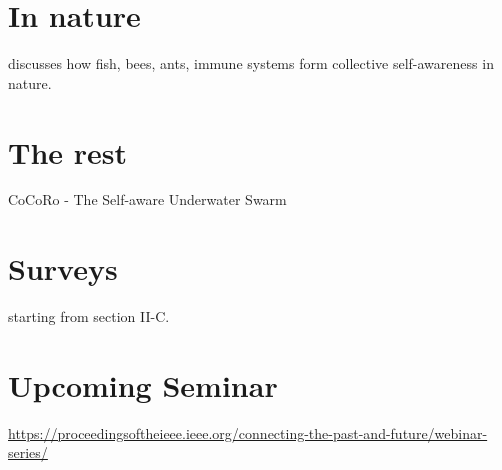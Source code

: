\documentclass{article}
\begin{document}
	\section{In nature}
	\citet{mitchell-2005-self-awareness-and-control-in-decentralized-systems} discusses how fish, bees, ants, immune systems form collective self-awareness in nature. 	
	
	\section{The rest}
	\cite{kernbach-2011-awareness-and-self-awareness-for-multi-robot-organisms}
	 
	CoCoRo - The Self-aware Underwater Swarm \cite{schmickl-2011-cocoro-the-self-aware-underwater-swarm}
	\section{Surveys}
	\cite{lewis-2011-a-survey-of-self-awareness-and-its-application-in-computing-systems} starting from section II-C.
	
	\section{Upcoming Seminar}
	\url{https://proceedingsoftheieee.ieee.org/connecting-the-past-and-future/webinar-series/}
	
\end{document}
